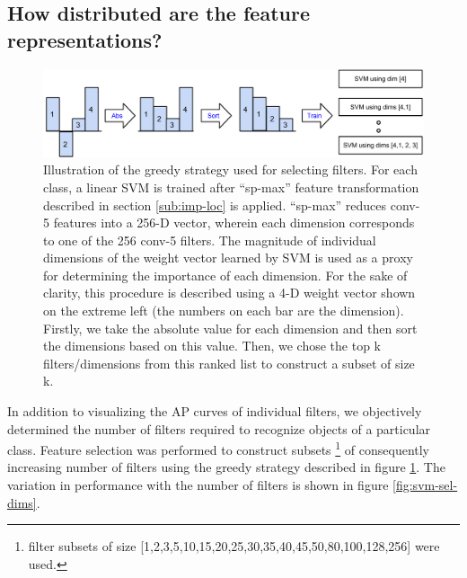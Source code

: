
\subsection{How distributed are the feature representations?}
\label{sub:how-many}
\begin{figure}[t!]
\centering
\includegraphics[scale=0.35]{images/how-many.pdf}
\caption{Illustration of the greedy strategy used for selecting filters. For each class, a linear SVM is trained after ``sp-max'' feature transformation described in section \ref{sub:imp-loc} is applied. ``sp-max''  reduces conv-5 features into a 256-D vector, wherein each dimension corresponds to one of the 256 conv-5 filters. The magnitude of individual dimensions of the weight vector learned by SVM is used as a proxy for determining the importance of each dimension. For the sake of clarity, this procedure is described using a 4-D weight vector shown on the extreme left (the numbers on each bar are the dimension). Firstly, we take the absolute value for each dimension and then sort the dimensions based on this value. Then, we chose the top k filters/dimensions from this ranked list to construct a subset of size k.}
\label{fig:sel-strategy}
\end{figure}

In addition to visualizing the AP curves of individual filters, we objectively determined the number of filters required to recognize objects of a particular class. Feature selection was performed to construct subsets \footnote{filter subsets of size [1,2,3,5,10,15,20,25,30,35,40,45,50,80,100,128,256] were used.} of consequently increasing number of filters using the greedy strategy described in figure \ref{fig:sel-strategy}. The variation in performance with the number of filters is shown in figure \ref{fig:svm-sel-dims}. 

